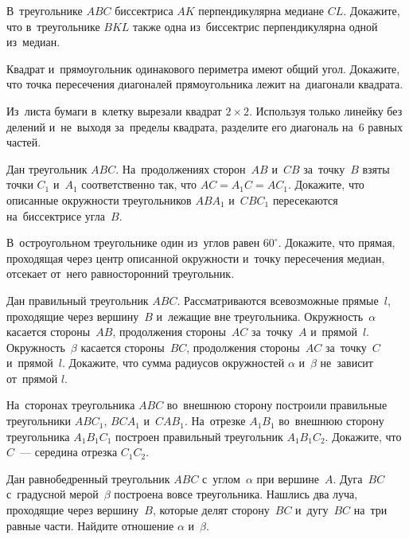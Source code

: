 


\begin{problems}

\item
В~треугольнике $ABC$ биссектриса $AK$ перпендикулярна медиане $CL$.
Докажите, что в~треугольнике $BKL$ также одна из~биссектрис перпендикулярна
одной из~медиан.

\item
Квадрат и~прямоугольник одинакового периметра имеют общий угол.
Докажите, что точка пересечения диагоналей прямоугольника лежит на~диагонали
квадрата.

\item
Из~листа бумаги в~клетку вырезали квадрат $2 \times 2$.
Используя только линейку без делений и~не~выходя за~пределы квадрата, разделите
его диагональ на~$6$ равных частей.

\item
Дан треугольник $ABC$.
На~продолжениях сторон~$AB$ и~$CB$ за~точку~$B$ взяты точки $C_1$ и~$A_1$
соответственно так, что $AC = A_1 C = A C_1$.
Докажите, что описанные окружности треугольников $A B A_1$ и~$C B C_1$
пересекаются на~биссектрисе угла~$B$.

\item
В~остроугольном треугольнике один из~углов равен $60^{\circ}$.
Докажите, что прямая, проходящая через центр описанной окружности и~точку
пересечения медиан, отсекает от~него равносторонний треугольник.

\item
Дан правильный треугольник $ABC$.
Рассматриваются всевозможные прямые~$l$, проходящие через вершину~$B$ и~лежащие
вне треугольника.
Окружность~$\alpha$ касается стороны~$AB$, продолжения стороны~$AC$
за~точку~$A$ и~прямой~$l$.
Окружность~$\beta$ касается стороны~$BC$, продолжения стороны~$AC$ за~точку~$C$
и~прямой~$l$.
Докажите, что сумма радиусов окружностей $\alpha$ и~$\beta$ не~зависит
от~прямой $l$.

\item
На~сторонах треугольника $ABC$ во~внешнюю сторону построили правильные
треугольники $A B C_1$, $B C A_1$ и~$C A B_1$.
На~отрезке $A_1 B_1$ во~внешнюю сторону треугольника $A_1 B_1 C_1$ построен
правильный треугольник $A_1 B_1 C_2$.
Докажите, что $C$~--- середина отрезка $C_1 C_2$.

\item
Дан равнобедренный треугольник $ABC$ с~углом~$\alpha$ при вершине~$A$.
Дуга~$BC$ с~градусной мерой~$\beta$ построена вовсе треугольника.
Нашлись два луча, проходящие через вершину~$B$, которые делят сторону~$BC$
и~дугу~$BC$ на~три равные части.
Найдите отношение $\alpha$ и~$\beta$.

\end{problems}

